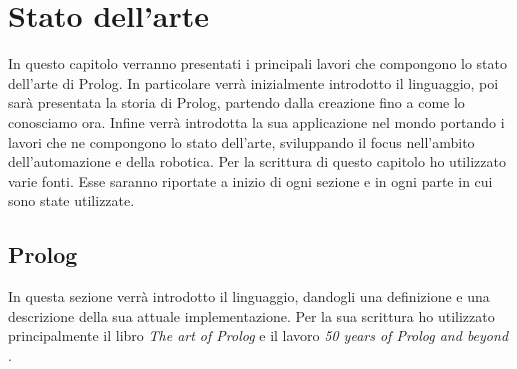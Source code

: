 \chapter{Stato dell'arte}
\label{cha:statoarte}
In questo capitolo verranno presentati i principali lavori che compongono lo stato
dell'arte di Prolog. In particolare verrà inizialmente introdotto il linguaggio, poi sarà presentata la storia di Prolog, partendo dalla creazione
fino a come lo conosciamo ora. Infine verrà introdotta la sua applicazione nel mondo portando i lavori che ne compongono lo stato dell'arte, sviluppando il focus nell'ambito dell'automazione e della robotica.
Per la scrittura di questo capitolo ho utilizzato varie fonti. Esse saranno riportate a inizio di ogni sezione e in ogni parte in cui sono state utilizzate.
\section{Prolog}
\label{sec:prolog}
In questa sezione verrà introdotto il linguaggio, dandogli una definizione e una descrizione della sua attuale implementazione. Per la sua scrittura ho utilizzato principalmente il libro \textit{The art of Prolog} \cite{krause_1995} e il lavoro \textit{50 years of Prolog and beyond} \cite{korner2022fifty}.

